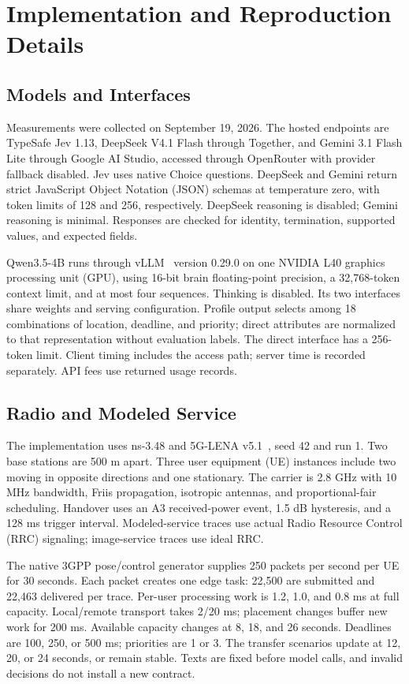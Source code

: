 \section{Implementation and Reproduction Details}
\label{app:implementation}
\subsection{Models and Interfaces}
Measurements were collected on September 19, 2026. The hosted endpoints are TypeSafe Jev 1.13, DeepSeek V4.1 Flash through Together, and Gemini 3.1 Flash Lite through Google AI Studio, accessed through OpenRouter with provider fallback disabled. Jev uses native Choice questions. DeepSeek and Gemini return strict JavaScript Object Notation (JSON) schemas at temperature zero, with token limits of 128 and 256, respectively. DeepSeek reasoning is disabled; Gemini reasoning is minimal. Responses are checked for identity, termination, supported values, and expected fields.

Qwen3.5-4B runs through vLLM~\cite{kwon2023efficient} version 0.29.0 on one NVIDIA L40 graphics processing unit (GPU), using 16-bit brain floating-point precision, a 32,768-token context limit, and at most four sequences. Thinking is disabled. Its two interfaces share weights and serving configuration. Profile output selects among 18 combinations of location, deadline, and priority; direct attributes are normalized to that representation without evaluation labels. The direct interface has a 256-token limit. Client timing includes the access path; server time is recorded separately. API fees use returned usage records.

\subsection{Radio and Modeled Service}
The implementation uses ns-3.48 and 5G-LENA v5.1~\cite{patriciello2019nr}, seed 42 and run 1. Two base stations are 500 m apart. Three user equipment (UE) instances include two moving in opposite directions and one stationary. The carrier is 2.8 GHz with 10 MHz bandwidth, Friis propagation, isotropic antennas, and proportional-fair scheduling. Handover uses an A3 received-power event, 1.5 dB hysteresis, and a 128 ms trigger interval. Modeled-service traces use actual Radio Resource Control (RRC) signaling; image-service traces use ideal RRC.

The native 3GPP pose/control generator supplies 250 packets per second per UE for 30 seconds. Each packet creates one edge task: 22,500 are submitted and 22,463 delivered per trace. Per-user processing work is 1.2, 1.0, and 0.8 ms at full capacity. Local/remote transport takes 2/20 ms; placement changes buffer new work for 200 ms. Available capacity changes at 8, 18, and 26 seconds. Deadlines are 100, 250, or 500 ms; priorities are 1 or 3. The transfer scenarios update at 12, 20, or 24 seconds, or remain stable. Texts are fixed before model calls, and invalid decisions do not install a new contract.


